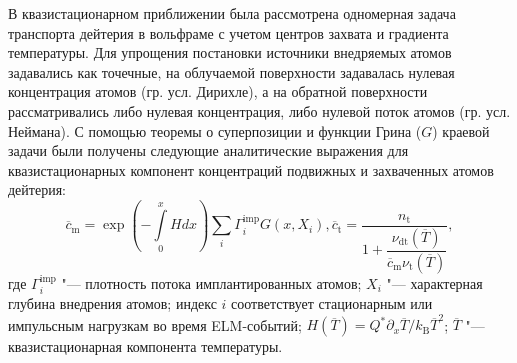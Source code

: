 В квазистационарном приближении была рассмотрена одномерная задача транспорта дейтерия в вольфраме с учетом центров захвата и градиента температуры. Для упрощения постановки источники внедряемых атомов задавались как точечные, на облучаемой поверхности задавалась нулевая концентрация атомов (гр. усл. Дирихле), а на обратной поверхности рассматривались либо нулевая концентрация, либо нулевой поток атомов (гр. усл. Неймана). С помощью теоремы о суперпозиции и функции Грина (\(G\)) краевой задачи были получены следующие аналитические выражения для квазистационарных компонент концентраций подвижных и захваченных атомов дейтерия:
\begin{subequations}
    \begin{equation}
        \label{eq:ss_solution}
        \overline{c}_{\mathrm{m}}= \exp\left(-\int\limits_0^x H dx \right) \sum \limits_{i} \Gamma_i^{\mathrm{imp}} G(x, X_i),
    \end{equation}
    \begin{equation}
        \overline{c}_{\mathrm{t}}=\dfrac{n_{\mathrm{t}}}{1+\dfrac{\nu_{\mathrm{dt}}(\overline{T})}{\overline{c}_{\mathrm{m}}\nu_{\mathrm{t}}(\overline{T})}},
    \end{equation}
\end{subequations}
где \( \Gamma_i^{\mathrm{imp}} \) "--- плотность потока имплантированных атомов; \( X_i \) "--- характерная глубина внедрения атомов; индекс \( i \) соответствует стационарным или импульсным нагрузкам во время ELM-событий; $H(\overline{T})=Q^*\partial_x \overline{T}/k_\mathrm{B}\overline{T}^2$; $\overline{T}$ "--- квазистационарная компонента температуры.


